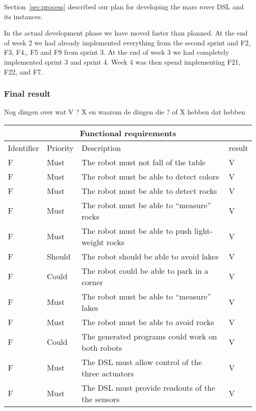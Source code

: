 Section~\ref{sec:process} described our plan for developing the mars rover
DSL and its instances. 

In the actual development phase we have moved faster than planned. At the end of
week 2 we had already implemented everything from the second sprint and F2, F3,
F4,, F5 and F9 from sprint 3. At the end of week 3 we had completely implemented
sprint 3 and sprint 4. Week 4 was then spend implementing F21, F22, and F7. 

\subsubsection{Final result}
Nog dingen over wat V ? X en waarom de dingen die ? of X hebben dat hebben

\setcounter{TCC}{1}
\begin{table}[H]
	\centering
	\begin{tabular}{|l|l|l|l|}
		\hline
		\multicolumn{4}{|c|}{Functional requirements} \\  \hline
		\hline
		Identifier & Priority & Description & result \\  
		\hline
		\hline
		F\doTCC  & Must & The robot must not fall of the table & V \\  \hline
		F\doTCC  & Must & The robot must be able to detect colors & V \\  \hline
		F\doTCC  & Must & The robot must be able to detect rocks & V \\  \hline
		F\doTCC  & Must & The robot must be able to ``measure'' rocks & V \\  \hline
		F\doTCC  & Must & The robot must be able to push light-weight rocks 
			& V \\  \hline
		F\doTCC  & Should & The robot should be able to avoid lakes & V \\  \hline
		F\doTCC  & Could & The robot could be able to park in a corner 
			& V \\  \hline
		F\doTCC & Must & The robot must be able to ``measure'' lakes & V \\  \hline
		F\doTCC & Must & The robot must be able to avoid rocks & V \\  \hline
		F\doTCC & Could & The generated programs could work on both robots
			& V\\  \hline
		F\doTCC & Must & The DSL must allow control of the three actuators & V
			\\  \hline
		F\doTCC & Must & The DSL must provide readouts of the the sensors & V
			\\  \hline

\end{tabular}
\end{table}
